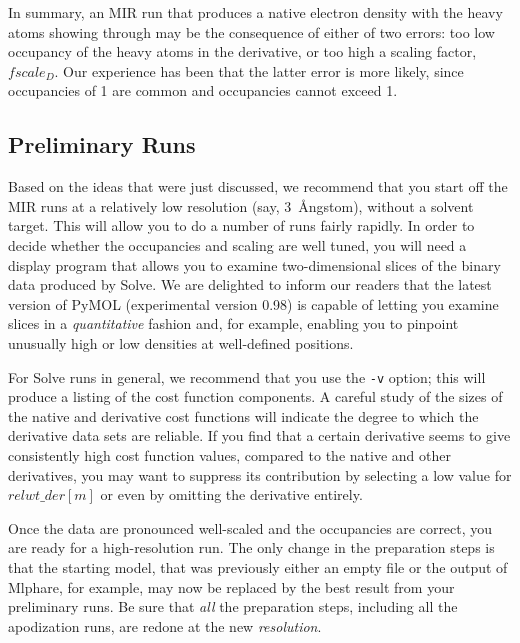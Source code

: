 \documentclass{report}
\begin{document}
\vspace {0.1in}

In summary, an MIR run that produces a native electron density with
the heavy atoms showing through may be the consequence of either of two
errors:  too low occupancy of the heavy atoms in the derivative, or too
high a scaling factor, $fscale_D$.  Our experience has been that
the latter error is more likely, since occupancies of 1 are common
and occupancies cannot exceed 1.

\subsection {Preliminary Runs}
\label{mir-solve-preliminary}

Based on the ideas that were just discussed, we recommend that 
you start off the MIR runs at a relatively low resolution 
(say, 3~\AA ngstom), without a solvent target.  
This will allow you to do a number of runs fairly rapidly.
In order to decide whether the occupancies
and scaling are well tuned, you will need a display program 
that allows you to examine two-dimensional slices of the binary
data produced by Solve.  
We are delighted to inform our readers that the latest version of PyMOL
(experimental version 0.98) is capable of letting
you examine slices in a {\em quantitative} fashion 
and, for example, enabling you to pinpoint 
unusually high or low densities at well-defined positions.

\vspace {0.1in}

For Solve runs in general, we recommend that you use the {\tt -v} 
option; this will produce a listing of the cost function components.
A careful study of the sizes of the native and derivative cost functions
will indicate the degree to which the derivative data sets are reliable.
If you find that a certain derivative seems to give consistently high
cost function values, compared to the native and other derivatives, 
you may want to suppress its contribution by selecting a low value for 
$relwt\_{der}[m]$ or even by omitting the derivative entirely.

Once the data are pronounced well-scaled and the occupancies are correct,
you are ready for a high-resolution run.  The only change in the preparation
steps is that the starting model, that was previously either an empty file
or the output of Mlphare, for example, may now be replaced by the best
result from your preliminary runs.  Be sure that {\em all} the 
preparation steps, including all the apodization runs, are redone at the
new {\it resolution}. 
\end{document}
